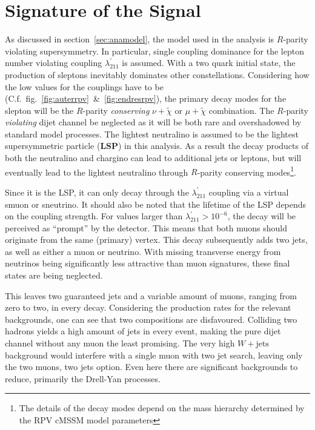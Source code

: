 \chapter{Signature of the Signal}
\label{cha:sig}

As discussed in section~\ref{sec:anamodel}, the model used in the analysis is $R$-parity violating supersymmetry. In particular, single coupling dominance for the lepton number violating coupling $\lambda^\prime_{211}$ is assumed. With a two quark initial state, the production of sleptons inevitably dominates other constellations. Considering how the low values for the couplings have to be (C.f.~fig.~\ref{fig:auterrpv}~\&~\ref{fig:endresrpv}), the primary decay modes for the slepton will be the $R$-parity \textit{conserving} $\nu + \tilde{\chi}$ or $\mu + \tilde{\chi}$ combination. The $R$-parity \textit{violating} dijet channel be neglected as it will be both rare and overshadowed by standard model processes. The lightest neutralino is assumed to be the lightest supersymmetric particle (\textbf{LSP}) in this analysis. As a result the decay products of both the neutralino and chargino can lead to additional jets or leptons, but will eventually lead to the lightest neutralino through $R$-parity conserving modes\footnote{The details of the decay modes depend on the mass hierarchy determined by the RPV cMSSM model parameters}. 


Since it is the LSP, it can only decay through the $\lambda^\prime_{211}$ coupling via a virtual smuon or sneutrino. It should also be noted that the lifetime of the LSP depends on the coupling strength. For values larger than $\lambda^\prime_{211} > 10^{-6}$, the decay will be perceived as ``prompt'' by the detector. This means that both muons should originate from the same (primary) vertex. This decay subsequently adds two jets, as well as either a muon or neutrino. With missing transverse energy from neutrinos being significantly less attractive than muon signatures, these final states are being neglected. 


This leaves two guaranteed jets and a variable amount of muons, ranging from zero to two, in every decay. Considering the production rates for the relevant backgrounds, one can see that two compositions are disfavoured. Colliding two hadrons yields a high amount of jets in every event, making the pure dijet channel without any muon the least promising. The very high $W + \text{jets}$ background would interfere with a single muon with two jet search, leaving only the two muons, two jets option. Even here there are significant backgrounds to reduce, primarily the Drell-Yan processes.

